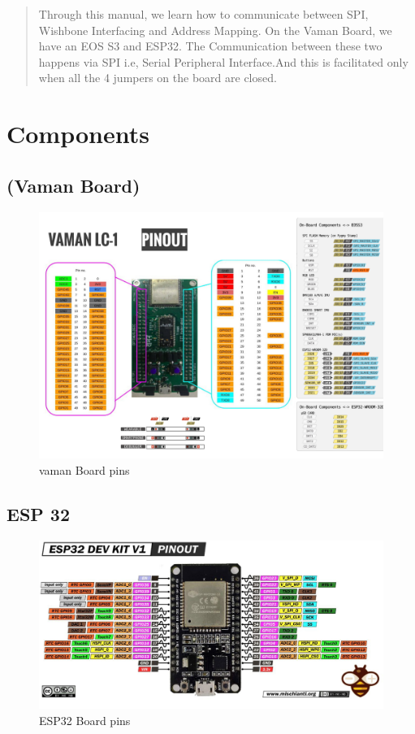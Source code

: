 \begin{abstract}
Through this manual, we learn how to communicate between SPI, Wishbone Interfacing and Address Mapping.
On the Vaman Board, we have an EOS S3 and ESP32. The Communication between these two happens via SPI i.e, Serial Peripheral Interface.And this is facilitated only when all the 4 jumpers on the board are closed.
\end{abstract}
\section{Components}
\subsection{(Vaman Board)}
\begin{figure}[H]
\centering
\includegraphics[width=0.5\columnwidth]{figs/pygme.png}
\caption{vaman Board pins}
\end{figure}
\subsection{ESP 32}
\begin{figure}[H]
\centering
\includegraphics[width=0.8\columnwidth]{figs/esp32.jpg}
\caption{ESP32 Board pins}
\end{figure}


